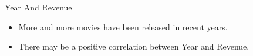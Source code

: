 \documentclass[
 size=12pt,
 paper=smartboard,  %
 mode=present, 		%
 display=slides, 	%
 style=tuliplab,  	%
 pauseslide,
 fleqn,leqno]{powerdot}
\begin{document}
\begin{slide}{Year And Revenue}
  \begin{itemize}
    \item
    More and more movies have been released in recent years. 
    \item
    There may be a positive correlation between Year and Revenue. 
  \end{itemize}
  \vspace{2cm}
\end{slide}
\end{document}
